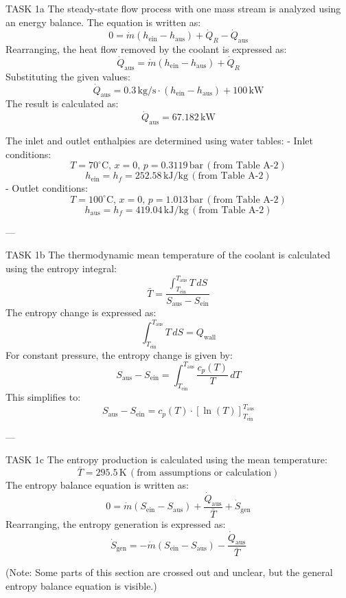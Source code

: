 TASK 1a  
The steady-state flow process with one mass stream is analyzed using an energy balance. The equation is written as:  
\[
0 = \dot{m} (h_{\text{ein}} - h_{\text{aus}}) + \dot{Q}_R - \dot{Q}_{\text{aus}}
\]  
Rearranging, the heat flow removed by the coolant is expressed as:  
\[
\dot{Q}_{\text{aus}} = \dot{m} (h_{\text{ein}} - h_{\text{aus}}) + \dot{Q}_R
\]  
Substituting the given values:  
\[
\dot{Q}_{\text{aus}} = 0.3 \, \text{kg/s} \cdot (h_{\text{ein}} - h_{\text{aus}}) + 100 \, \text{kW}
\]  
The result is calculated as:  
\[
\dot{Q}_{\text{aus}} = 67.182 \, \text{kW}
\]  

The inlet and outlet enthalpies are determined using water tables:  
- Inlet conditions:  
  \[
  T = 70^\circ\text{C}, \, x = 0, \, p = 0.3119 \, \text{bar} \, (\text{from Table A-2})
  \]  
  \[
  h_{\text{ein}} = h_f = 252.58 \, \text{kJ/kg} \, (\text{from Table A-2})
  \]  
- Outlet conditions:  
  \[
  T = 100^\circ\text{C}, \, x = 0, \, p = 1.013 \, \text{bar} \, (\text{from Table A-2})
  \]  
  \[
  h_{\text{aus}} = h_f = 419.04 \, \text{kJ/kg} \, (\text{from Table A-2})
  \]  

---

TASK 1b  
The thermodynamic mean temperature of the coolant is calculated using the entropy integral:  
\[
\bar{T} = \frac{\int_{T_{\text{ein}}}^{T_{\text{aus}}} T \, dS}{S_{\text{aus}} - S_{\text{ein}}}
\]  
The entropy change is expressed as:  
\[
\int_{T_{\text{ein}}}^{T_{\text{aus}}} T \, dS = Q_{\text{wall}}
\]  
For constant pressure, the entropy change is given by:  
\[
S_{\text{aus}} - S_{\text{ein}} = \int_{T_{\text{ein}}}^{T_{\text{aus}}} \frac{c_p(T)}{T} \, dT
\]  
This simplifies to:  
\[
S_{\text{aus}} - S_{\text{ein}} = c_p(T) \cdot \left[\ln(T)\right]_{T_{\text{ein}}}^{T_{\text{aus}}}
\]  

---

TASK 1c  
The entropy production is calculated using the mean temperature:  
\[
\bar{T} = 295.5 \, \text{K} \, (\text{from assumptions or calculation})
\]  
The entropy balance equation is written as:  
\[
0 = \dot{m} (S_{\text{ein}} - S_{\text{aus}}) + \frac{\dot{Q}_{\text{aus}}}{\bar{T}} + \dot{S}_{\text{gen}}
\]  
Rearranging, the entropy generation is expressed as:  
\[
\dot{S}_{\text{gen}} = -\dot{m} (S_{\text{ein}} - S_{\text{aus}}) - \frac{\dot{Q}_{\text{aus}}}{\bar{T}}
\]  

(Note: Some parts of this section are crossed out and unclear, but the general entropy balance equation is visible.)